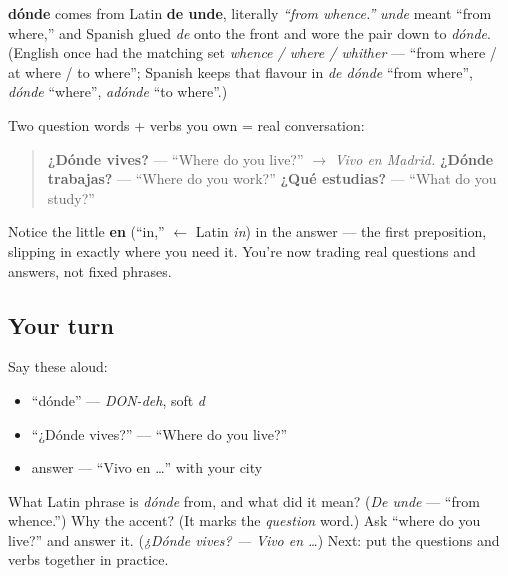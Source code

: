 \begin{cousinweb}
\textbf{dónde} comes from Latin \textbf{de unde}, literally \emph{\textquotedblleft{}from whence.\textquotedblright{}} \emph{unde} meant \textquotedblleft{}from where,\textquotedblright{} and Spanish glued \emph{de} onto the front and wore the pair down to \emph{dónde}. (English once had the matching set \emph{whence / where / whither} — \textquotedblleft{}from where / at where / to where\textquotedblright{}; Spanish keeps that flavour in \emph{de dónde} \textquotedblleft{}from where\textquotedblright{}, \emph{dónde} \textquotedblleft{}where\textquotedblright{}, \emph{adónde} \textquotedblleft{}to where\textquotedblright{}.)
\end{cousinweb}

\begin{grammarlens}[title={Grammar Lens: your first getting-to-know-you questions}]
Two question words + verbs you own = real conversation:

\begin{quote}
\textbf{¿Dónde vives?} — \textquotedblleft{}Where do you live?\textquotedblright{} $\to$ \emph{Vivo en Madrid.} \textbf{¿Dónde trabajas?} — \textquotedblleft{}Where do you work?\textquotedblright{} \textbf{¿Qué estudias?} — \textquotedblleft{}What do you study?\textquotedblright{}
\end{quote}

Notice the little \textbf{en} (\textquotedblleft{}in,\textquotedblright{} $\leftarrow$ Latin \emph{in}) in the answer — the first preposition, slipping in exactly where you need it. You're now trading real questions and answers, not fixed phrases.
\end{grammarlens}

\subsection*{Your turn}
Say these aloud:

\begin{itemize}
\raggedright
  \item \textquotedblleft{}dónde\textquotedblright{} — \emph{DON-deh}, soft \emph{d}
  \item \textquotedblleft{}¿Dónde vives?\textquotedblright{} — \textquotedblleft{}Where do you live?\textquotedblright{}
  \item answer — \textquotedblleft{}Vivo en …\textquotedblright{} with your city
\end{itemize}

\begin{tcolorbox}[breakable,colback=teal!4,colframe=teal!35!black,title={Before you move on}]
What Latin phrase is \emph{dónde} from, and what did it mean? (\emph{De unde} — \textquotedblleft{}from whence.\textquotedblright{}) Why the accent? (It marks the \emph{question} word.) Ask \textquotedblleft{}where do you live?\textquotedblright{} and answer it. (\emph{¿Dónde vives? — Vivo en …}) Next: put the questions and verbs together in practice.
\end{tcolorbox}

